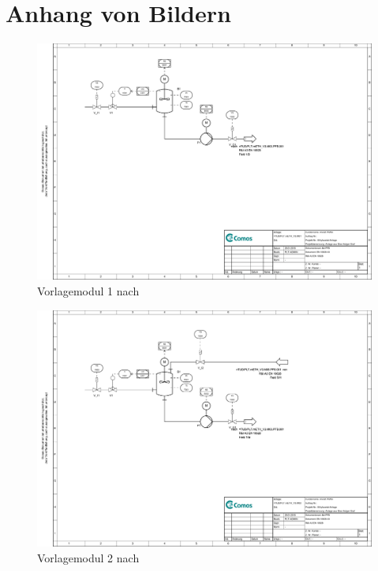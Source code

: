 \chapter{Anhang von Bildern}
\label{cha:anhang_bilder}
\begin{figure}[h!tb]
\centering
\includegraphics[height=\textwidth,angle=90]{bilder/M01_Vorlage_1_mit_Pumpe.pdf}
\caption[PID Modul 1]{Vorlagemodul 1 nach \cite{Pfeffer_2016}}
\label{fig:PIDMod1}
\end{figure}

\begin{figure}[h!tb]
\centering
\includegraphics[height=\textwidth,angle=90]{bilder/M02_Vorlage_2_mit_Pumpe.pdf}
\caption[PID Modul 2]{Vorlagemodul 2 nach \cite{Pfeffer_2016}}
\label{fig:PIDMod2}
\end{figure}

